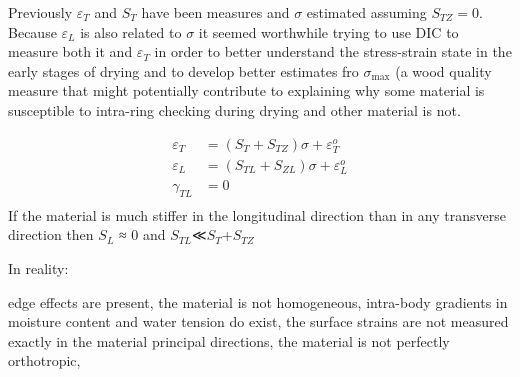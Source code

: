 Previously $\varepsilon_T$ and $S_T$ have been measures and $\sigma$ estimated assuming $S_{TZ}=0$\citep{bookerXX}. Because $\varepsilon_L$ is also related to $\sigma$ it seemed worthwhile trying to use DIC to measure both it and $\varepsilon_T$ in order to better understand the stress-strain state in the early stages of drying and to develop better estimates fro $\sigma_\max$ (a wood quality measure that might potentially contribute to explaining why some material is susceptible to intra-ring checking during drying and other material is not.

\begin{eqnarray}
\varepsilon_T &= \left(S_T + S_{TZ}\right)\sigma + \varepsilon^o_T \\
\varepsilon_L &= \left(S_{TL} + S_{ZL}\right)\sigma + \varepsilon^o_L \\
\gamma_{TL} &= 0 \\
\end{eqnarray}
If the material is much stiffer in the longitudinal direction than in any transverse direction then $S_L$ ≈ 0 and $S_{TL}
$≪$S_T$+$S_{TZ}$




In reality:

    edge effects are present,
    the material is not homogeneous,
    intra-body gradients in moisture content and water tension do exist,
    the surface strains are not measured exactly in the material principal directions,
    the material is not perfectly orthotropic,